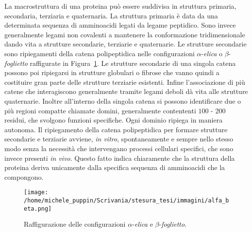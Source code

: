 La macrostruttura di una proteina può essere suddivisa in struttura primaria, secondaria, terziaria e quaternaria. La struttura primaria è data da una determinata sequenza di amminoacidi legati da legame peptidico. Sono invece generalmente legami non covalenti a mantenere la conformazione tridimensionale dando vita a strutture secondarie, terziarie e quaternarie. Le strutture secondarie sono ripiegamenti della catena polipeptidica nelle configurazioni $ \alpha $-\textit{elica} o $ \beta $-\textit{foglietto} raffigurate in Figura~\ref{fig:alfa_beta}. Le strutture  secondarie di una singola catena possono poi ripiegarsi in strutture globulari o fibrose che vanno quindi a costituire gran parte delle strutture terziarie esistenti. Infine l'associazione di più catene che interagiscono generalmente tramite legami deboli dà vita alle strutture quaternarie. Inoltre all'interno della singola catena si possono identificare due o più regioni compatte chiamate domini, generalmente contententi $ 100 $ - $ 200 $ residui, che svolgono funzioni specifiche. Ogni dominio ripiega in maniera autonoma.
Il ripiegamento della catena polipeptidica per formare strutture secondarie e terziarie avviene, \textit{in vitro}, spontaneamente e sempre nello stesso modo senza la necessità che intervengano processi cellulari specifici, che sono invece presenti \textit{in vivo}. Questo fatto indica chiaramente che la struttura della proteina deriva unicamente dalla specifica sequenza di amminoacidi che la compongono. \cite{protein_physics}
\begin{figure}[h]
	\centering
	\texttt{[image: /home/michele\_puppin/Scrivania/stesura\_tesi/immagini/alfa\_beta.png]}
	\caption{Raffigurazione delle configurazioni $ \alpha $-\textit{elica} e $ \beta $-\textit{foglietto}. \cite{protein_physics}}
	\label{fig:alfa_beta}
\end{figure}

